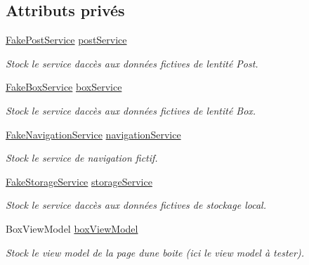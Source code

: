 \subsection*{Attributs privés}
\begin{DoxyCompactItemize}
\item 
\hyperlink{class_boxes_1_1_tests_1_1_mock_1_1_services_1_1_fake_post_service}{Fake\+Post\+Service} \hyperlink{class_boxes_1_1_tests_1_1_box_view_model_tests_a829b9b859b727182afb2eb3a427c030a}{post\+Service}
\begin{DoxyCompactList}\small\item\em Stock le service d\textquotesingle{}accès aux données fictives de l\textquotesingle{}entité Post. \end{DoxyCompactList}\item 
\hyperlink{class_boxes_1_1_tests_1_1_mock_1_1_services_1_1_fake_box_service}{Fake\+Box\+Service} \hyperlink{class_boxes_1_1_tests_1_1_box_view_model_tests_a04618b94ae1c36e1d89ad38cb10ae7e9}{box\+Service}
\begin{DoxyCompactList}\small\item\em Stock le service d\textquotesingle{}accès aux données fictives de l\textquotesingle{}entité Box. \end{DoxyCompactList}\item 
\hyperlink{class_boxes_1_1_tests_1_1_mock_1_1_services_1_1_fake_navigation_service}{Fake\+Navigation\+Service} \hyperlink{class_boxes_1_1_tests_1_1_box_view_model_tests_a688092cd2b39fbcb90a09c21a30d5330}{navigation\+Service}
\begin{DoxyCompactList}\small\item\em Stock le service de navigation fictif. \end{DoxyCompactList}\item 
\hyperlink{class_boxes_1_1_tests_1_1_mock_1_1_services_1_1_fake_storage_service}{Fake\+Storage\+Service} \hyperlink{class_boxes_1_1_tests_1_1_box_view_model_tests_a3abe073002190161d00e791a25d22f32}{storage\+Service}
\begin{DoxyCompactList}\small\item\em Stock le service d\textquotesingle{}accès aux données fictives de stockage local. \end{DoxyCompactList}\item 
Box\+View\+Model \hyperlink{class_boxes_1_1_tests_1_1_box_view_model_tests_a551e212c039c5d0ae2356c19ec49ed34}{box\+View\+Model}
\begin{DoxyCompactList}\small\item\em Stock le view model de la page d\textquotesingle{}une boite (ici le view model à tester). \end{DoxyCompactList}\end{DoxyCompactItemize}
